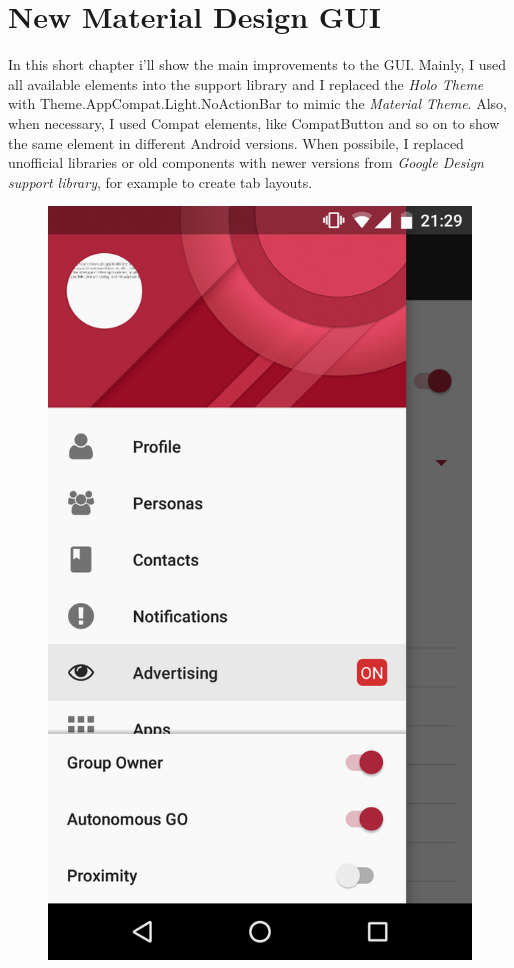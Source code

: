 \chapter{New Material Design GUI}
\label{gui}

In this short chapter i'll show the main improvements to the GUI.
Mainly, I used all available elements into the support library and I replaced the \emph{Holo Theme} with \textsf{Theme.AppCompat.Light.NoActionBar} to mimic the \emph{Material Theme}. Also, when necessary, I used \textsf{Compat} elements, like \textsf{CompatButton} and so on to show the same element in different Android versions. When possibile, I replaced unofficial libraries or old components with newer versions from \emph{Google Design support library}, for example to create tab layouts. 

\begin{figure}[thpb]
\centering
\begin{minipage}[b]{0.4\textwidth}
	\centering
	\includegraphics[scale=0.1]{./images/chap3/drawer.png}

\end{minipage}
\end{figure}
